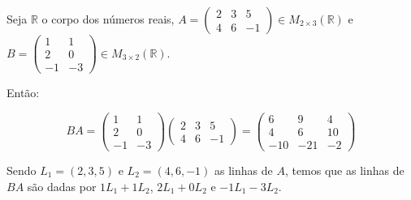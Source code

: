 \begin{example}
    Seja $\mathbb R$ o corpo dos números reais, $A=\begin{pmatrix}
        2 & 3 & 5 \\
        4 & 6 & -1
    \end{pmatrix}\in M_{2 \times 3}(\mathbb R)$ e $B=\begin{pmatrix}
        1 & 1 \\
        2 & 0 \\
        -1 & -3
    \end{pmatrix}\in M_{3 \times 2}(\mathbb R)$.

    Então:

    \begin{equation*}
        BA = \begin{pmatrix}
            1 & 1 \\
            2 & 0 \\
            -1 & -3
        \end{pmatrix}
        \begin{pmatrix}
            2 & 3 & 5 \\
            4 & 6 & -1
        \end{pmatrix}
        =
        \begin{pmatrix}
            6 & 9 & 4 \\
            4 & 6 & 10 \\
            -10 & -21 & -2
        \end{pmatrix}
    \end{equation*}

    Sendo $L_1=(2, 3, 5)$ e $L_2=(4, 6, -1)$ as linhas de $A$, temos que as linhas de $BA$ são dadas por $1L_1+1L_2$, $2L_1+0L_2$ e $-1L_1-3L_2$.

\end{example}